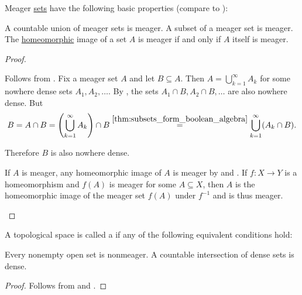 \begin{proposition}\label{thm:meager_set_properties}\cite[43]{Rudin1991}
  Meager \hyperref[def:meager_set]{sets} have the following basic properties (compare to ):
  \begin{propenum}
     A countable union of meager sets is meager.
     A subset of a meager set is meager.
     The \hyperref[def:homeomorphism]{homeomorphic} image of a set \( A \) is meager if and only if \( A \) itself is meager.
  \end{propenum}
\end{proposition}
\begin{proof}\mbox{}
  \begin{description}
     Follows from .
     Fix a meager set \( A \) and let \( B \subseteq A \). Then \( A = \bigcup_{k=1}^\infty A_k \) for some nowhere dense sets \( A_1, A_2, \ldots \). By , the sets \( A_1 \cap B, A_2 \cap B, \ldots \) are also nowhere dense. But
    \begin{equation*}
      B
      =
      A \cap B
      =
      \left(\bigcup_{k=1}^\infty A_k \right) \cap B
      \overset {\ref{thm:subsets_form_boolean_algebra}} =
      \bigcup_{k=1}^\infty (A_k \cap B).
    \end{equation*}

    Therefore \( B \) is also nowhere dense.

    \mbox{}
    \begin{description}
      \ImpliedBy If \( A \) is meager, any homeomorphic image of \( A \) is meager by  and .
      \Implies If \( f: X \to Y \) is a homeomorphism and \( f(A) \) is meager for some \( A \subseteq X \), then \( A \) is the homeomorphic image of the meager set \( f(A) \) under \( f^{-1} \) and is thus meager.
    \end{description}
  \end{description}
\end{proof}

\begin{definition}\label{def:baire_space}
  A topological space is called a  if any of the following equivalent conditions hold:
  \begin{defenum}
     Every nonempty open set is nonmeager.
     A countable intersection of dense sets is dense.
  \end{defenum}
\end{definition}
\begin{proof}
   Follows from  and .
\end{proof}

